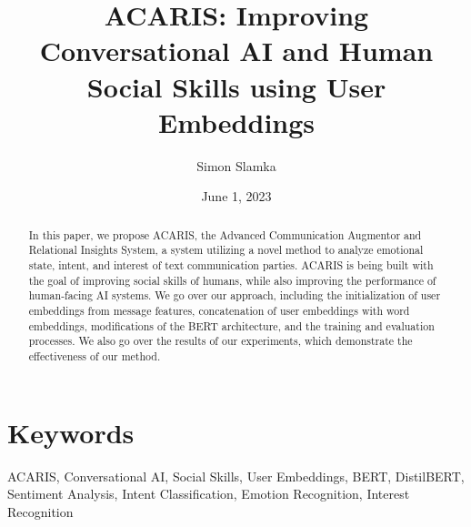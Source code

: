 \documentclass{article}
\title{ACARIS: Improving Conversational AI and Human Social Skills using User Embeddings}
\author{Simon Slamka}
\date{June 1, 2023}
\begin{document}
\maketitle

\begin{abstract}
In this paper, we propose ACARIS, the Advanced Communication Augmentor and Relational Insights System, a system utilizing a novel method to analyze emotional state, intent, and interest of text communication parties. ACARIS is being built with the goal of improving social skills of humans, while also improving the performance of human-facing AI systems. We go over our approach, including the initialization of user embeddings from message features, concatenation of user embeddings with word embeddings, modifications of the BERT architecture, and the training and evaluation processes. We also go over the results of our experiments, which demonstrate the effectiveness of our method.
\end{abstract}

\section{Keywords}
ACARIS, Conversational AI, Social Skills, User Embeddings, BERT, DistilBERT, Sentiment Analysis, Intent Classification, Emotion Recognition, Interest Recognition
\end{document}
